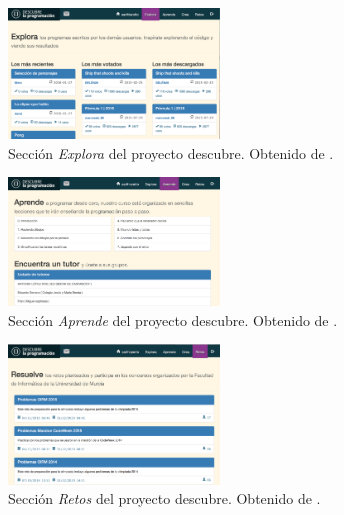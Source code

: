 \begin{figure}[!ht]
	\begin{centering}
		\includegraphics[width=0.5\textwidth]{images/descubre-explora.png}
				\caption{Sección \emph{Explora} del proyecto \Gls{descubre}. Obtenido de \cite{descubre}.}
				\label{fig:descubre-explora}
	\end{centering}
\end{figure}



\begin{figure}[!ht]
	\begin{centering}
		\includegraphics[width=0.5\textwidth]{images/descubre-aprende.png}
				\caption{Sección \emph{Aprende} del proyecto \Gls{descubre}. Obtenido de \cite{descubre}.}
				\label{fig:descubre-aprende}
	\end{centering}
\end{figure}


\begin{figure}[!ht]
	\begin{centering}
		\includegraphics[width=0.5\textwidth]{images/descubre-retos.png}
				\caption{Sección \emph{Retos} del proyecto \Gls{descubre}. Obtenido de \cite{descubre}.}
				\label{fig:descubre-retos}
	\end{centering}
\end{figure}


